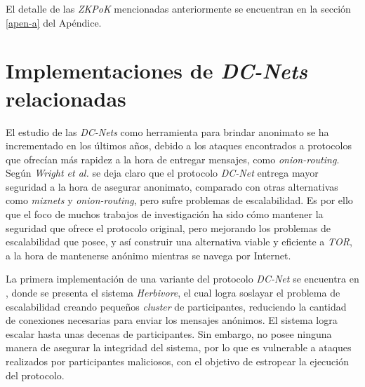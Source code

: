 El detalle de las \emph{ZKPoK} mencionadas anteriormente se encuentran en la 
sección \ref{apen-a} del Apéndice.

\section{Implementaciones de \emph{DC-Nets} relacionadas}

El estudio de las \emph{DC-Nets} como herramienta para brindar anonimato se ha 
incrementado en los últimos años, debido a los ataques 
encontrados a protocolos que ofrecían más rapidez a la hora de entregar 
mensajes, como \emph{onion-routing}. Según \emph{Wright et al.} 
\cite{wright2002analysis} se deja claro que el protocolo \emph{DC-Net} entrega 
mayor seguridad a la hora de asegurar anonimato, comparado con otras 
alternativas como \emph{mixnets} y \emph{onion-routing}, 
pero sufre problemas de escalabilidad. Es por ello que el foco de muchos 
trabajos de investigación ha sido cómo mantener la 
seguridad que ofrece el protocolo original, pero mejorando los problemas de 
escalabilidad que posee, y así construir 
una alternativa viable y eficiente a \emph{TOR}, a la hora de mantenerse 
anónimo mientras se navega por Internet.

La primera implementación de una variante del protocolo \emph{DC-Net} se 
encuentra en \cite{goel2003herbivore}, donde se presenta el 
sistema \emph{Herbivore}, el cual logra soslayar el problema de escalabilidad 
creando pequeños \emph{cluster} de participantes, 
reduciendo la cantidad de conexiones necesarias para enviar los mensajes 
anónimos. El sistema logra escalar hasta unas decenas 
de participantes. Sin embargo, no posee ninguna manera de asegurar la 
integridad del sistema, por lo que es vulnerable a 
ataques realizados por participantes maliciosos, con el objetivo de estropear 
la ejecución del protocolo.

